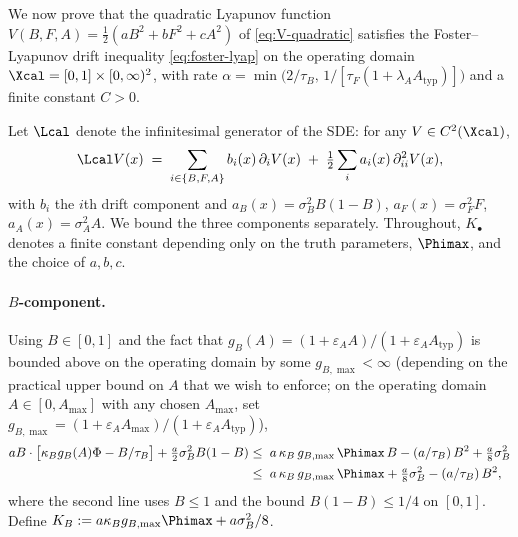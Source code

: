 We now prove that the quadratic Lyapunov function
$V(B,F,A) = \tfrac{1}{2}(a B^2 + b F^2 + c A^2)$ of
\eqref{eq:V-quadratic} satisfies the Foster--Lyapunov drift
inequality \eqref{eq:foster-lyap} on the operating domain
$\Xcal = [0,1] \times [0,\infty)^2$, with rate
$\alpha = \min\!\bigl(2/\tau_B,\,1/[\tau_F(1+\lambda_A A_{\mathrm{typ}})]\bigr)$
and a finite constant $C > 0$.

Let $\Lcal$ denote the infinitesimal generator of the SDE: for any
$V \in C^2(\Xcal)$,
\begin{equation}
  \Lcal V(x) \;=\;
    \sum_{i \in \{B,F,A\}} b_i(x)\,\partial_i V(x)
    \;+\; \tfrac{1}{2}\sum_i a_i(x)\,\partial_{ii}^2 V(x),
  \label{eq:generator}
\end{equation}
with $b_i$ the $i$th drift component and
$a_B(x) = \sigma_B^2 B(1-B)$,
$a_F(x) = \sigma_F^2 F$,
$a_A(x) = \sigma_A^2 A$. We bound the three components separately.
Throughout, $K_\bullet$ denotes a finite constant depending only on
the truth parameters, $\Phimax$, and the choice of $a,b,c$.

\paragraph{$B$-component.} Using $B \in [0,1]$ and the fact that
$g_B(A) = (1+\varepsilon_A A)/(1+\varepsilon_A A_{\mathrm{typ}})$
is bounded above on the operating domain by some
$g_{B,\max} < \infty$ (depending on the practical upper bound on
$A$ that we wish to enforce; on the operating domain
$A \in [0,A_{\max}]$ with any chosen $A_{\max}$, set
$g_{B,\max} = (1+\varepsilon_A A_{\max})/(1+\varepsilon_A A_{\mathrm{typ}})$),
\begin{align*}
  a B \cdot \bigl[\kappa_B g_B(A) \Phi - B/\tau_B\bigr]
   + \tfrac{a}{2} \sigma_B^2 B(1-B)
  &\le \;a\,\kappa_B\,g_{B,\max}\,\Phimax\,B - (a/\tau_B)\,B^2 + \tfrac{a}{8}\sigma_B^2 \\
  &\le \;a\,\kappa_B\,g_{B,\max}\,\Phimax + \tfrac{a}{8}\sigma_B^2 - (a/\tau_B)\,B^2,
\end{align*}
where the second line uses $B \le 1$ and the bound
$B(1-B) \le 1/4$ on $[0,1]$. Define
$K_B := a\kappa_B g_{B,\max}\Phimax + a\sigma_B^2/8$.

